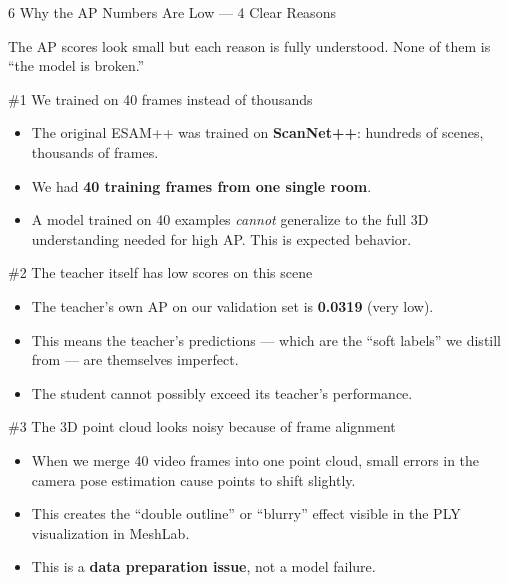 \documentclass[12pt,a4paper]{article}
\begin{document}
\begin{sectionbox}[warnorange]{6 \quad Why the AP Numbers Are Low — 4 Clear Reasons}

The AP scores look small but each reason is fully understood. None of them is
``the model is broken.''

\vspace{6pt}
\begin{diagnosisbox}[warnorange]{\#1 \quad We trained on 40 frames instead of thousands}
\begin{itemize}[noitemsep]
  \item The original ESAM++ was trained on \textbf{ScanNet++}: hundreds of scenes,
        thousands of frames.
  \item We had \textbf{40 training frames from one single room}.
  \item A model trained on 40 examples \textit{cannot} generalize to the full 3D
        understanding needed for high AP. This is expected behavior.
\end{itemize}
\end{diagnosisbox}

\vspace{6pt}
\begin{diagnosisbox}[warnorange]{\#2 \quad The teacher itself has low scores on this scene}
\begin{itemize}[noitemsep]
  \item The teacher's own AP on our validation set is \textbf{0.0319} (very low).
  \item This means the teacher's predictions — which are the ``soft labels'' we distill
        from — are themselves imperfect.
  \item The student cannot possibly exceed its teacher's performance.
\end{itemize}
\end{diagnosisbox}

\vspace{6pt}
\begin{diagnosisbox}[warnorange]{\#3 \quad The 3D point cloud looks noisy because of frame alignment}
\begin{itemize}[noitemsep]
  \item When we merge 40 video frames into one point cloud, small errors in the
        camera pose estimation cause points to shift slightly.
  \item This creates the ``double outline'' or ``blurry'' effect visible in the PLY
        visualization in MeshLab.
  \item This is a \textbf{data preparation issue}, not a model failure.
\end{itemize}
\end{diagnosisbox}


\end{sectionbox}
\end{document}
